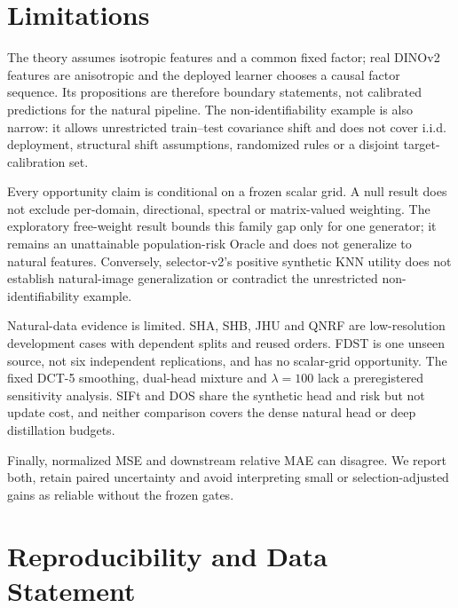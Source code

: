 \documentclass[10pt]{article}
\begin{document}
\FloatBarrier
\section{Limitations}
\label{sec:limitations}

The theory assumes isotropic features and a common fixed factor; real DINOv2
features are anisotropic and the deployed learner chooses a causal factor
sequence.  Its propositions are therefore boundary statements, not calibrated
predictions for the natural pipeline.  The non-identifiability example is also
narrow: it allows unrestricted train--test covariance shift and does not cover
i.i.d. deployment, structural shift assumptions, randomized rules or a
disjoint target-calibration set.

Every opportunity claim is conditional on a frozen scalar grid.  A null result
does not exclude per-domain, directional, spectral or matrix-valued weighting.
The exploratory free-weight result bounds this family gap only for one
generator; it remains an unattainable population-risk Oracle and does not
generalize to natural features.  Conversely, selector-v2's positive synthetic
KNN utility does not establish natural-image generalization or contradict the
unrestricted non-identifiability example.

Natural-data evidence is limited.  SHA, SHB, JHU and QNRF are low-resolution
development cases with dependent splits and reused orders.  FDST is one unseen
source, not six independent replications, and has no scalar-grid opportunity.
The fixed DCT-5 smoothing, dual-head mixture and $\lambda=100$ lack a
preregistered sensitivity analysis.  SIFt and DOS share the synthetic head and
risk but not update cost, and neither comparison covers the dense natural
head or deep distillation budgets.

Finally, normalized MSE and downstream relative MAE can disagree.  We report
both, retain paired uncertainty and avoid interpreting small or
selection-adjusted gains as reliable without the frozen gates.

\section{Reproducibility and Data Statement}
\label{sec:reproducibility}
\end{document}
